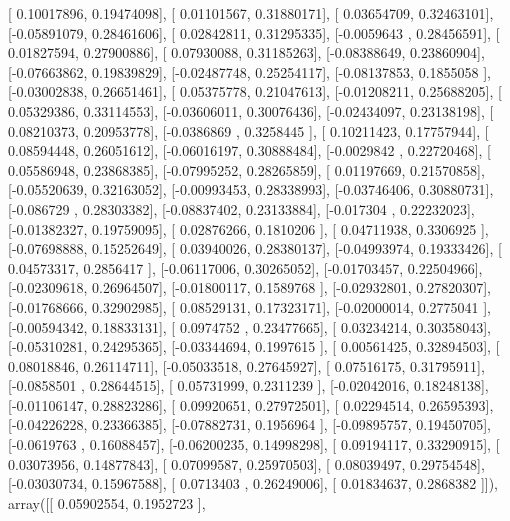 \documentclass{article}
\begin{document}
       [ 0.10017896,  0.19474098],
       [ 0.01101567,  0.31880171],
       [ 0.03654709,  0.32463101],
       [-0.05891079,  0.28461606],
       [ 0.02842811,  0.31295335],
       [-0.0059643 ,  0.28456591],
       [ 0.01827594,  0.27900886],
       [ 0.07930088,  0.31185263],
       [-0.08388649,  0.23860904],
       [-0.07663862,  0.19839829],
       [-0.02487748,  0.25254117],
       [-0.08137853,  0.1855058 ],
       [-0.03002838,  0.26651461],
       [ 0.05375778,  0.21047613],
       [-0.01208211,  0.25688205],
       [ 0.05329386,  0.33114553],
       [-0.03606011,  0.30076436],
       [-0.02434097,  0.23138198],
       [ 0.08210373,  0.20953778],
       [-0.0386869 ,  0.3258445 ],
       [ 0.10211423,  0.17757944],
       [ 0.08594448,  0.26051612],
       [-0.06016197,  0.30888484],
       [-0.0029842 ,  0.22720468],
       [ 0.05586948,  0.23868385],
       [-0.07995252,  0.28265859],
       [ 0.01197669,  0.21570858],
       [-0.05520639,  0.32163052],
       [-0.00993453,  0.28338993],
       [-0.03746406,  0.30880731],
       [-0.086729  ,  0.28303382],
       [-0.08837402,  0.23133884],
       [-0.017304  ,  0.22232023],
       [-0.01382327,  0.19759095],
       [ 0.02876266,  0.1810206 ],
       [ 0.04711938,  0.3306925 ],
       [-0.07698888,  0.15252649],
       [ 0.03940026,  0.28380137],
       [-0.04993974,  0.19333426],
       [ 0.04573317,  0.2856417 ],
       [-0.06117006,  0.30265052],
       [-0.01703457,  0.22504966],
       [-0.02309618,  0.26964507],
       [-0.01800117,  0.1589768 ],
       [-0.02932801,  0.27820307],
       [-0.01768666,  0.32902985],
       [ 0.08529131,  0.17323171],
       [-0.02000014,  0.2775041 ],
       [-0.00594342,  0.18833131],
       [ 0.0974752 ,  0.23477665],
       [ 0.03234214,  0.30358043],
       [-0.05310281,  0.24295365],
       [-0.03344694,  0.1997615 ],
       [ 0.00561425,  0.32894503],
       [ 0.08018846,  0.26114711],
       [-0.05033518,  0.27645927],
       [ 0.07516175,  0.31795911],
       [-0.0858501 ,  0.28644515],
       [ 0.05731999,  0.2311239 ],
       [-0.02042016,  0.18248138],
       [-0.01106147,  0.28823286],
       [ 0.09920651,  0.27972501],
       [ 0.02294514,  0.26595393],
       [-0.04226228,  0.23366385],
       [-0.07882731,  0.1956964 ],
       [-0.09895757,  0.19450705],
       [-0.0619763 ,  0.16088457],
       [-0.06200235,  0.14998298],
       [ 0.09194117,  0.33290915],
       [ 0.03073956,  0.14877843],
       [ 0.07099587,  0.25970503],
       [ 0.08039497,  0.29754548],
       [-0.03030734,  0.15967588],
       [ 0.0713403 ,  0.26249006],
       [ 0.01834637,  0.2868382 ]]), array([[ 0.05902554,  0.1952723 ],
\end{document}
